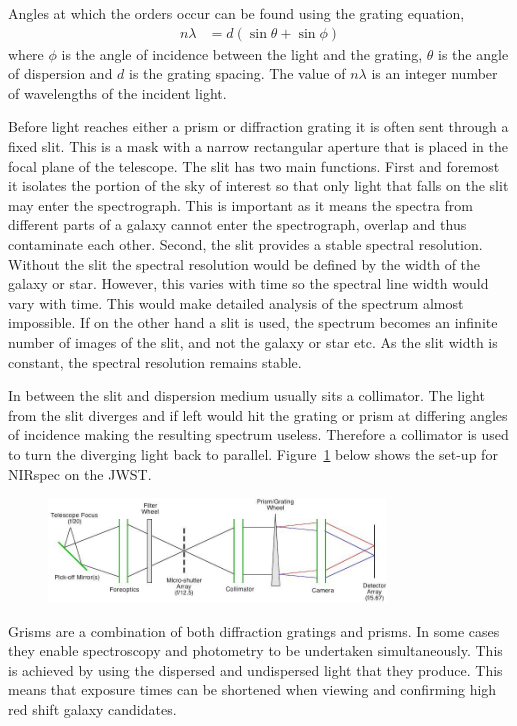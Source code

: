 	Angles at which the orders occur can be found using the grating equation\cite{DiffGrating},
	\begin{align}
		n\lambda &= d(\sin\theta + \sin\phi)
	\end{align}
	where $\phi$ is the angle of incidence between the light and the grating, $\theta$ is the angle of dispersion and $d$ is the grating spacing. The value of $n\lambda$ is an integer number of wavelengths of the incident light.

	Before light reaches either a prism or diffraction grating it is often sent through a fixed slit. This is a mask with a narrow rectangular aperture that is placed in the focal plane of the telescope. The slit has two main functions. First and foremost it isolates the portion of the sky of interest so that only light that falls on the slit may enter the spectrograph. This is important as it means the spectra from different parts of a galaxy cannot enter the spectrograph, overlap and thus contaminate each other. Second, the slit provides a stable spectral resolution. Without the slit the spectral resolution would be defined by the width of the galaxy or star. However, this varies with time so the spectral line width would vary with time. This would make detailed analysis of the spectrum almost impossible. If on the other hand a slit is used, the spectrum becomes an infinite number of images of the slit, and not the galaxy or star etc. As the slit width is constant, the spectral resolution remains stable\cite{SpectoG}.

	In between the slit and dispersion medium usually sits a collimator. The light from the slit diverges and if left would hit the grating or prism at differing angles of incidence making the resulting spectrum useless. Therefore a collimator is used to turn the diverging light back to parallel. Figure~\ref{fig:nirspec_jwst} below shows the set-up for NIRspec on the JWST.
	\begin{figure}[htbp]
		\centering
			\includegraphics[width=0.8\textwidth]{../Images/nirspec_jwst.jpeg}
		\caption{\label{fig:nirspec_jwst}}
	\end{figure}

	Grisms are a combination of both diffraction gratings and prisms. In some cases they enable spectroscopy and photometry to be undertaken simultaneously. This is achieved by using the dispersed and undispersed light that they produce. This means that exposure times can be shortened when viewing and confirming high red shift galaxy candidates.

